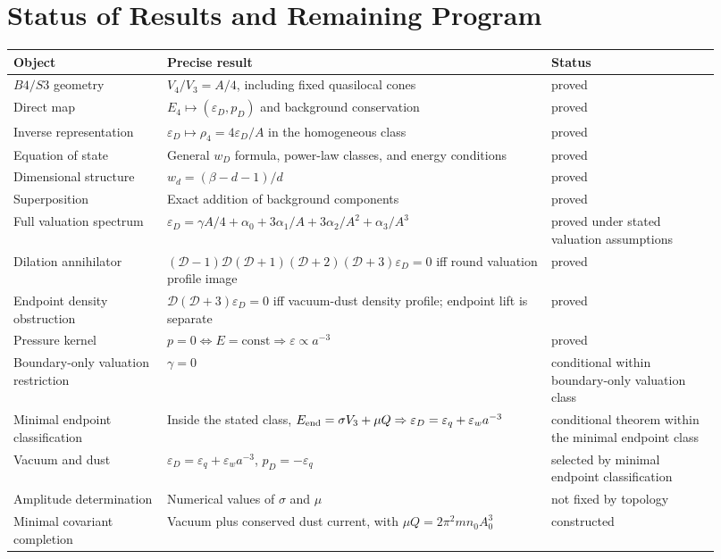 \documentclass[11pt,a4paper]{article}
\def\Bfour{B4}%
\def\Sthree{S3}%
\numberwithin{equation}{section}
\theoremstyle{remark}
\newcommand{\Sthree}{S^3}
\newcommand{\Bfour}{B^4}
\newcommand{\Dil}{\mathscr{D}}
\newcommand{\Efour}{E_4}
\newcommand{\rhoFour}{\rho_4}
\newcommand{\epsD}{\varepsilon_D}
\newcommand{\pD}{p_D}
\begin{document}
\section{Status of Results and Remaining Program}
\begin{center}
\begin{tabular}{@{}p{0.20\linewidth}p{0.50\linewidth}p{0.22\linewidth}@{}}
\toprule
Object & Precise result & Status \\
\midrule
\(\Bfour/\Sthree\) geometry & \(V_4/V_3=A/4\), including fixed quasilocal cones & proved \\
Direct map & \(\Efour\mapsto(\epsD,\pD)\) and background conservation & proved \\
Inverse representation & \(\epsD\mapsto\rhoFour=4\epsD/A\) in the homogeneous class & proved \\
Equation of state & General \(w_D\) formula, power-law classes, and energy conditions & proved \\
Dimensional structure & \(w_d=(\beta-d-1)/d\) & proved \\
Superposition & Exact addition of background components & proved \\
Full valuation spectrum & \(\epsD=\gamma A/4+\alpha_0+3\alpha_1/A+3\alpha_2/A^2+\alpha_3/A^3\) & proved under stated valuation assumptions \\
Dilation annihilator & \((\Dil-1)\Dil(\Dil+1)(\Dil+2)(\Dil+3)\epsD=0\) iff round valuation profile image & proved \\
Endpoint density obstruction & \(\Dil(\Dil+3)\epsD=0\) iff vacuum-dust density profile; endpoint lift is separate & proved \\
Pressure kernel & \(p=0\iff E=\mathrm{const}\Rightarrow\varepsilon\propto a^{-3}\) & proved \\
Boundary-only valuation restriction & \(\gamma=0\) & conditional within boundary-only valuation class \\
Minimal endpoint classification & Inside the stated class, \(E_{\rm end}=\sigma V_3+\mu Q\Rightarrow \epsD=\varepsilon_q+\varepsilon_w a^{-3}\) & conditional theorem within the minimal endpoint class \\
Vacuum and dust & \(\epsD=\varepsilon_q+\varepsilon_w a^{-3}\), \(\pD=-\varepsilon_q\) & selected by minimal endpoint classification \\
Amplitude determination & Numerical values of \(\sigma\) and \(\mu\) & not fixed by topology \\
Minimal covariant completion & Vacuum plus conserved dust current, with \(\mu Q=2\pi^2mn_0A_0^3\) & constructed \\

\end{tabular}
\end{center}
\end{document}

